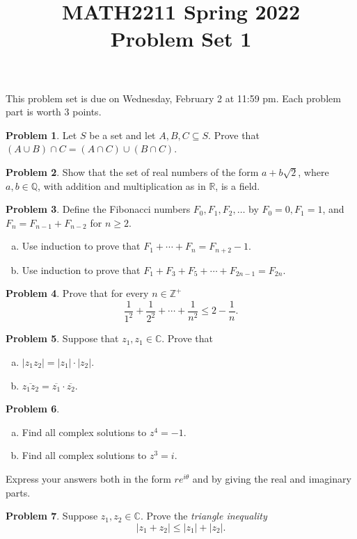 \documentclass[11pt,oneside]{amsart}
\title{MATH2211 Spring 2022\\
Problem Set 1}
\theoremstyle{definition}
\newtheorem{problem}{Problem}
\newcommand{\bC}{\mathbb{C}}
\newcommand{\bQ}{\mathbb{Q}}
\newcommand{\bR}{\mathbb{R}}
\newcommand{\bZ}{\mathbb{Z}}
\begin{document}
    \maketitle
    This problem set is due on Wednesday, February 2 at 11:59 pm. Each problem part is worth 3 points.

    \begin{problem}
        Let $S$ be a set and let $A,B,C\subseteq S$. Prove that $(A\cup B)\cap C=(A\cap C)\cup(B\cap C)$.
    \end{problem}

    \begin{problem}
        Show that the set of real numbers of the form $a+b\sqrt2$, where $a,b\in\bQ$, with addition and multiplication as in $\bR$, is a field.
    \end{problem}

    \begin{problem}
        Define the Fibonacci numbers $F_0,F_1,F_2,\dots$ by $F_0=0,F_1=1$, and $F_n=F_{n-1}+F_{n-2}$ for $n\geq 2$.
        \begin{enumerate}[(a)]
            \item Use induction to prove that $F_1+\cdots+F_n=F_{n+2}-1$.
            \item Use induction to prove that $F_1+F_3+F_5+\cdots+F_{2n-1}=F_{2n}$.
        \end{enumerate}
    \end{problem}

    \begin{problem}
        Prove that for every $n\in\bZ^+$
        \[\frac 1{1^2}+\frac 1{2^2}+\cdots+\frac 1{n^2}\leq 2-\frac 1n.\]
    \end{problem}

    \begin{problem}
        Suppose that $z_1,z_1\in\bC$. Prove that
        \begin{enumerate}[(a)]
            \item $|z_1z_2|=|z_1|\cdot|z_2|$.
            \item $\overline{z_1z_2}=\overline{z_1}\cdot\overline{z_2}$.
        \end{enumerate}
    \end{problem}

    \begin{problem}\hfill
        \begin{enumerate}[(a)]
            \item Find all complex solutions to $z^4=-1$.
            \item Find all complex solutions to $z^3=i$.
        \end{enumerate}
        Express your answers both in the form $re^{i\theta}$ and by giving the real and imaginary parts.
    \end{problem}

    \begin{problem}
        Suppose $z_1,z_2\in\bC$. Prove the \emph{triangle inequality}
        \[|z_1+z_2|\leq |z_1|+|z_2|.\]
    \end{problem}
\end{document}
